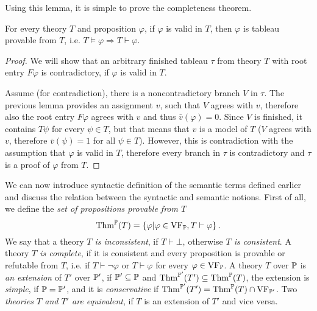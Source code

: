 Using this lemma, it is simple to prove the completeness theorem.

\begin{theorem}
For every theory $T$ and proposition $\varphi$, if $\varphi$ is valid in $T$, then $\varphi$ is tableau provable from $T$, i.e. $T \vDash \varphi \Rightarrow T \vdash \varphi$.
\end{theorem}
\begin{proof}
We will show that an arbitrary finished tableau $\tau$ from theory $T$ with root entry $F \varphi$ is contradictory, if $\varphi$ is valid in $T$.

Assume (for contradiction), there is a noncontradictory branch $V$ in $\tau$. The previous lemma provides an assignment $v$, such that $V$ agrees with $v$, therefore also the root entry $F \varphi$ agrees with $v$ and thus $\bar{v}(\varphi) = 0$. Since $V$ is finished, it contains $T \psi$ for every $\psi \in T$, but that means that $v$ is a model of $T$ ($V$ agrees with $v$, therefore $\bar{v}(\psi) = 1$ for all $\psi \in T$). However, this is contradiction with the assumption that $\varphi$ is valid in $T$, therefore every branch in $\tau$ is contradictory and $\tau$ is a proof of $\varphi$ from $T$. 
\end{proof}

We can now introduce syntactic definition of the semantic terms defined earlier and discuss the relation between the syntactic and semantic notions. First of all, we define the \emph{set of propositions provable from $T$} $$\operatorname{Thm}^\mathbb{P}(T) = \{\varphi | \varphi \in \operatorname{VF}_\mathbb{P}, T \vdash \varphi\}\,.$$ We say that a theory \emph{$T$ is inconsistent}, if $T \vdash \bot$, otherwise \emph{$T$ is consistent}. A theory \emph{$T$ is complete}, if it is consistent and every proposition is provable or refutable from $T$, i.e. if $T \vdash \neg \varphi$ or $T \vdash \varphi$ for every $\varphi \in \operatorname{VF}_\mathbb{P}$. A theory $T$ over $\mathbb{P}$ is \emph{an extension} of $T'$ over $\mathbb{P}'$, if $\mathbb{P}' \subseteq \mathbb{P}$ and $\operatorname{Thm}^{\mathbb{P}'}(T') \subseteq \operatorname{Thm}^{\mathbb{P}}(T)$, the extension is \emph{simple}, if $\mathbb{P} = \mathbb{P}'$, and it is \emph{conservative} if $\operatorname{Thm}^{\mathbb{P}'}(T') = \operatorname{Thm}^{\mathbb{P}}(T) \cap \operatorname{VF}_{\mathbb{P}'}$. Two \emph{theories $T$ and $T'$ are equivalent}, if $T$ is an extension of $T'$ and vice versa.

